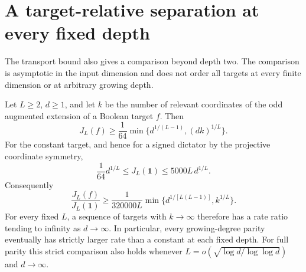 \section{A target-relative separation at every fixed depth}
\label{sec:critical-fixed-depth-ordering}

The transport bound also gives a comparison beyond depth two. The
comparison is asymptotic in the input dimension and does not order all
targets at every finite dimension or at arbitrary growing depth.

\begin{theorem}
\label{thm:critical-fixed-depth-ordering}
Let $L\ge2$, $d\ge1$, and let $k$ be the number of relevant coordinates
of the odd augmented extension of a Boolean target $f$. Then
\begin{equation}
 J_L(f)\ge\frac1{64}
       \min\{d^{1/(L-1)},(dk)^{1/L}\}.
 \label{eq:critical-fixed-depth-lower}
\end{equation}
For the constant target, and hence for a signed dictator by the
projective coordinate symmetry,
\begin{equation}
 \frac1{64}d^{1/L}\le J_L(\mathbf1)
       \le5000L\,d^{1/L}.
 \label{eq:critical-constant-fixed-depth}
\end{equation}
Consequently
\[
 \frac{J_L(f)}{J_L(\mathbf1)}
 \ge\frac1{320000L}
       \min\{d^{1/[L(L-1)]},k^{1/L}\}.
\]
For every fixed $L$, a sequence of targets with $k\to\infty$ therefore
has a rate ratio tending to infinity as $d\to\infty$. In particular,
every growing-degree parity eventually has strictly larger rate than
a constant at each fixed depth. For full parity this strict comparison
also holds whenever
$L=o(\sqrt{\log d/\log\log d})$ and $d\to\infty$.
\end{theorem}

